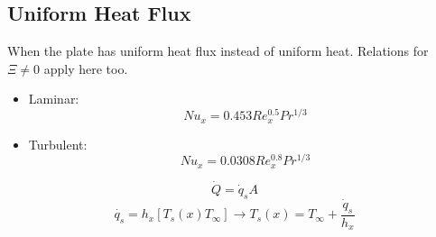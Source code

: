 \documentclass[a4paper,12pt]{report}
\begin{document}
\subsection{Uniform Heat Flux}
When the plate has uniform heat flux instead of uniform heat. Relations for $\Xi \neq 0$ apply here too. 
\begin{itemize}
\item Laminar: $$Nu_x = 0.453 Re_x^{0.5}Pr^{1/3}$$
\item Turbulent: $$Nu_x = 0.0308 Re_x^{0.8}Pr^{1/3}$$
\end{itemize}

$$\dot{Q} = \dot{q}_s A$$ $$\dot{q_s} = h_x[T_s(x) T_\infty] \to T_s(x) = T_\infty + \frac{\dot{q}_s}{h_x}$$
\end{document}
